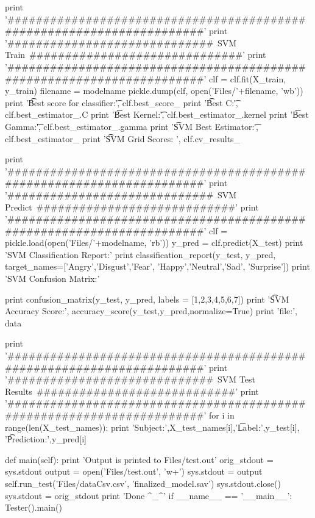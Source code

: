 \begin{pythoncode}
        print '\n######################################################################'
        print '#############################~SVM Train~##############################'
        print '######################################################################'
        clf = clf.fit(X_train, y_train)
        filename = modelname
        pickle.dump(clf, open('Files/'+filename, 'wb'))
        print '\t Best score for classifier:\t', clf.best_score_
        print '\t Best C:\t', clf.best_estimator_.C
        print '\t Best Kernel:\t', clf.best_estimator_.kernel
        print '\t Best Gamma:\t', clf.best_estimator_.gamma
        print '\t SVM Best Estimator:\t', clf.best_estimator_
        print '\n\t SVM Grid Scores: \n', clf.cv_results_

        print '\n######################################################################'
        print '#############################~SVM Predict~############################'
        print '######################################################################'
        clf = pickle.load(open('Files/'+modelname, 'rb'))
        y_pred = clf.predict(X_test)
        print 'SVM Classification Report:'
        print classification_report(y_test, y_pred,
                                    target_names=['Angry','Disgust','Fear',
                                    'Happy','Neutral','Sad', 'Surprise'])
        print 'SVM Confusion Matrix:'

        print confusion_matrix(y_test, y_pred, labels = [1,2,3,4,5,6,7])
        print '\t SVM Accuracy Score:', accuracy_score(y_test,y_pred,normalize=True)
        print 'file:', data

        print '\n######################################################################'
        print '#############################~SVM Test Results~############################'
        print '######################################################################'
        for i in range(len(X_test_names)):
            print 'Subject:',X_test_names[i],'\t Label:',y_test[i],
            		'\t Prediction:',y_pred[i]

    def main(self):
        print 'Output is printed to Files/test.out'
        orig_stdout = sys.stdout
        output = open('Files/test.out', 'w+')
        sys.stdout = output
        self.run_test('Files/dataCsv.csv', 'finalized_model.sav')
        sys.stdout.close()
        sys.stdout = orig_stdout
        print 'Done ^_^'
if __name__ == '__main__': Tester().main()
       \end{pythoncode}
